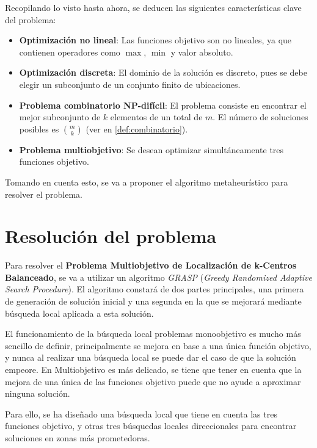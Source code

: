\documentclass[12pt,a4paper]{book}
\begin{document}
Recopilando lo visto hasta ahora, se deducen las siguientes características clave del problema:

\begin{itemize}
    \item \textbf{Optimización no lineal}: Las funciones objetivo son no lineales, ya que contienen operadores como $\max$, $\min$ y valor absoluto.
    
    \item \textbf{Optimización discreta}: El dominio de la solución es discreto, pues se debe elegir un subconjunto de un conjunto finito de ubicaciones.
    
    \item \textbf{Problema combinatorio NP-difícil}: El problema consiste en encontrar el mejor subconjunto de $k$ elementos de un total de $m$. El número de soluciones posibles es $\binom{m}{k}$ (ver en \ref{def:combinatorio}).
    
    \item \textbf{Problema multiobjetivo}: Se desean optimizar simultáneamente tres funciones objetivo.
\end{itemize}

Tomando en cuenta esto, se va a proponer el algoritmo metaheurístico para resolver el problema.


\chapter{Resolución del problema}
Para resolver el \textbf{Problema Multiobjetivo de Localización de k-Centros Balanceado}, se va a utilizar un algoritmo \textit{GRASP} (\textit{Greedy Randomized Adaptive Search Procedure}).
El algoritmo constará de dos partes principales, una primera de generación de solución inicial y una segunda en la que se mejorará mediante búsqueda local aplicada a esta solución.

El funcionamiento de la búsqueda local problemas monoobjetivo es mucho más sencillo de definir, principalmente se mejora en base a una única función objetivo, y nunca al realizar una búsqueda local se puede dar el caso de que la solución empeore. En Multiobjetivo es más delicado,
se tiene que tener en cuenta que la mejora de una única de las funciones objetivo puede que no ayude a aproximar ninguna solución.

Para ello, se ha diseñado una búsqueda local que tiene en cuenta las tres funciones objetivo, y otras tres búsquedas locales direccionales para encontrar soluciones en zonas más prometedoras.
\end{document}
